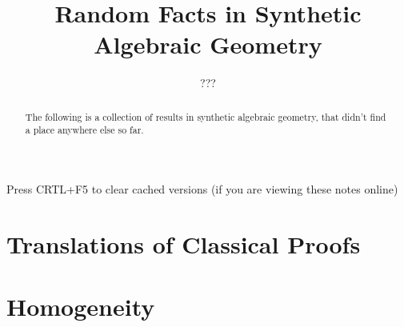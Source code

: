 \documentclass{../util/zariski}
\title{Random Facts in Synthetic Algebraic Geometry}
\author{???}
\begin{document}
\maketitle

\begin{center}
  \color{purple}
  \large{Press CRTL+F5 to clear cached versions}
  \large{(if you are viewing these notes online)}
\end{center}

\begin{abstract}
  The following is a collection of results in synthetic algebraic geometry,
  that didn't find a place anywhere else so far.
\end{abstract}

\tableofcontents

\section{Translations of Classical Proofs}


\section{Homogeneity}


\printindex

\printbibliography
\end{document}
